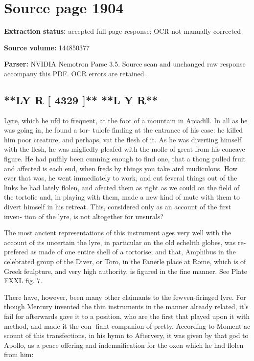 \clearpage
\section{Source page 1904}
\textbf{Extraction status:} accepted full-page response; OCR not manually corrected\par
\textbf{Source volume:} 144850377\par
\textbf{Parser:} NVIDIA Nemotron Parse 3.5. Source scan and unchanged raw response accompany this PDF. OCR errors are retained.\par\medskip
\subsection*{**LY R  [ 4329 ]** **L Y R**}
Lyre, which he ufd to frequent, at the foot of a mountain in Arcadill. In all as he was going in, he found a tor- tulofe finding at the entrance of his case: he killed him poor creature, and perhaps, vat the flesh of it. As he was diverting himself with the flesh, he was migliedly pleafed with the molle of great from his concave figure. He had puffily been cunning enough to find one, that a thong pulled fruit and affected is each end, when freds by things you take aird mudiculous. How ever that was, he went immediately to work, and eut feveral things out of the links he had lately flolen, and afected them as right as we could on the field of the tortofie and, in playing with them, made a new kind of mute with them to divert himself in his retreat. This, considered only as an account of the first inven- tion of the lyre, is not altogether for unsurals?\par\medskip
The most ancient representations of this instrument ages very well with the account of its uncertain the lyre, in particular on the old echelith globes, was re- prefered as made of one entire shell of a tortorise; and that, Amphibus in the celebrated group of the Diver, or Toro, in the Fanerle place at Rome, which is of Greek feulpture, and very high authority, is figured in the fine manner. See Plate EXXL fig. 7.\par\medskip
There have, however, been many other claimants to the fewven-firinged lyre. For though Mercury invented the thin instruments in the manner already related, it's fail for afterwards gave it to a position, who are the first that played upon it with method, and made it the con- fiant companion of pretty. According to Moment ac scount of this transfections, in his hymn to Aftervery, it was given by that god to Apollo, as a peace offering and indemnification for the oxen which he had flolen from him:\par\medskip
